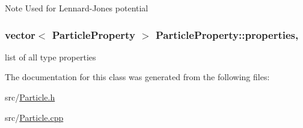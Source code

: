 \begin{DoxyNote}{Note}
Used for Lennard-\/\-Jones potential 
\end{DoxyNote}
\hypertarget{classSimulation_1_1ParticleProperty_a347c0996e25e4d4fa48ca1ce3db7e7f7}{
\subsubsection[{properties}]{\setlength{\rightskip}{0pt plus 5cm}vector$<$ {\bf Particle\-Property} $>$ Particle\-Property\-::properties\hspace{0.3cm}{\ttfamily [static]}, {\ttfamily [private]}}}\label{classSimulation_1_1ParticleProperty_a347c0996e25e4d4fa48ca1ce3db7e7f7}


list of all type properties 



The documentation for this class was generated from the following files\-:\begin{DoxyCompactItemize}
\item 
src/\hyperlink{Particle_8h}{Particle.\-h}\item 
src/\hyperlink{Particle_8cpp}{Particle.\-cpp}\end{DoxyCompactItemize}

